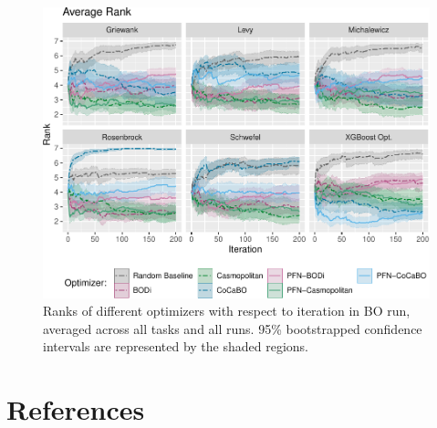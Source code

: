 \documentclass[12pt,twoside]{reedthesis}
\begin{document}
\begin{figure}
\centering
\includegraphics{thesis_files/figure-latex/bo-rank-individual-tasks-1.pdf}
\caption{\label{fig:bo-rank-individual-tasks}Ranks of different optimizers with respect to iteration in BO run, averaged across all tasks and all runs. 95\% bootstrapped confidence intervals are represented by the shaded regions.}
\end{figure}
\backmatter

\hypertarget{references}{%
\chapter*{References}\label{references}}


\noindent

\setlength{\parindent}{-0.20in}
\end{document}
